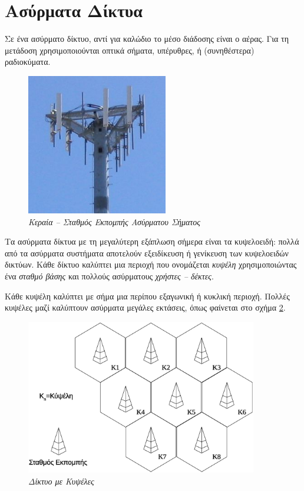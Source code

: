 %
%
\setcounter{section}{4}
\section{Ασύρματα Δίκτυα}
Σε ένα ασύρματο δίκτυο, αντί για καλώδιο το μέσο διάδοσης είναι ο αέρας. Για τη μετάδοση χρησιμοποιούνται οπτικά σήματα, υπέρυθρες, ή (συνηθέστερα) ραδιοκύματα. 

\begin{figure}[!h]
  \centering
  \includegraphics[width=0.55\textwidth]{images/chapter2/2-5}
  \caption {\textsl{Κεραία -- Σταθμός Εκπομπής Ασύρματου Σήματος}}
  \label{2-5}
\end{figure}

Τα ασύρματα δίκτυα με τη μεγαλύτερη εξάπλωση σήμερα είναι τα κυψελοειδή: πολλά από τα ασύρματα συστήματα αποτελούν εξειδίκευση ή γενίκευση των κυψελοειδών δικτύων. Κάθε δίκτυο καλύπτει μια περιοχή που ονομάζεται \emph{κυψέλη} χρησιμοποιώντας ένα \emph{σταθμό βάσης} και πολλούς ασύρματους \emph{χρήστες -- δέκτες}. 

Κάθε κυψέλη καλύπτει με σήμα μια περίπου εξαγωνική ή κυκλική περιοχή. Πολλές κυψέλες μαζί καλύπτουν ασύρματα μεγάλες εκτάσεις, όπως φαίνεται στο σχήμα \ref{2-6}.

\begin{figure}[!ht]
  \centering
  \includegraphics[width=0.90\textwidth]{images/chapter2/2-6}
  \caption {\textsl{Δίκτυο με Κυψέλες}}
  \label{2-6}
\end{figure}

